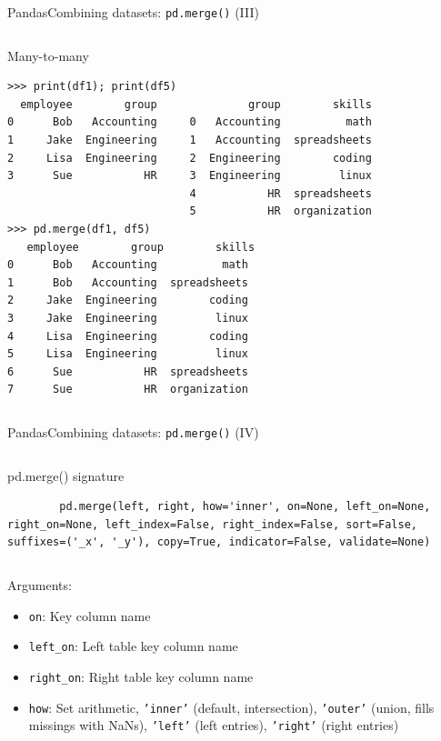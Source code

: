 \documentclass[10pt,compress]{beamer} %
\begin{document}
\begin{frame}[fragile]{Pandas}{Combining datasets: \texttt{pd.merge()} (III)}
	\scriptsize{
	\begin{columns}
		\begin{exampleblock}{\footnotesize{Many-to-many}}
		\vspace{-0.2cm} 
		\begin{lstlisting}
>>> print(df1); print(df5)
  employee        group              group        skills
0      Bob   Accounting     0   Accounting          math
1     Jake  Engineering     1   Accounting  spreadsheets
2     Lisa  Engineering     2  Engineering        coding
3      Sue           HR     3  Engineering         linux
                            4           HR  spreadsheets
                            5           HR  organization
>>> pd.merge(df1, df5)
   employee        group        skills
0      Bob   Accounting          math
1      Bob   Accounting  spreadsheets
2     Jake  Engineering        coding
3     Jake  Engineering         linux
4     Lisa  Engineering        coding
5     Lisa  Engineering         linux
6      Sue           HR  spreadsheets
7      Sue           HR  organization
		\end{lstlisting}
		\vspace{-0.2cm} 
		\end{exampleblock}
	\end{columns}
	}
\end{frame}

\begin{frame}[fragile]{Pandas}{Combining datasets: \texttt{pd.merge()} (IV)}
	\begin{columns}
	\begin{block}{pd.merge() signature}
		\vspace{-0.2cm} 
		\begin{lstlisting}
		pd.merge(left, right, how='inner', on=None, left_on=None, right_on=None, left_index=False, right_index=False, sort=False, suffixes=('_x', '_y'), copy=True, indicator=False, validate=None)
		\end{lstlisting}
		\vspace{-0.2cm} 
		\end{block}
	\end{columns}
	
	\bigskip

	Arguments:
	\begin{itemize}
		\item \texttt{on}: Key column name
		\item \texttt{left\_on}: Left table key column name
		\item \texttt{right\_on}: Right table key column name
		\item \texttt{how}: Set arithmetic, \texttt{'inner'} (default, intersection), \texttt{'outer'} (union, fills missings with NaNs), \texttt{'left'} (left entries), \texttt{'right'} (right entries)
	\end{itemize}

\end{frame}
\end{document}
